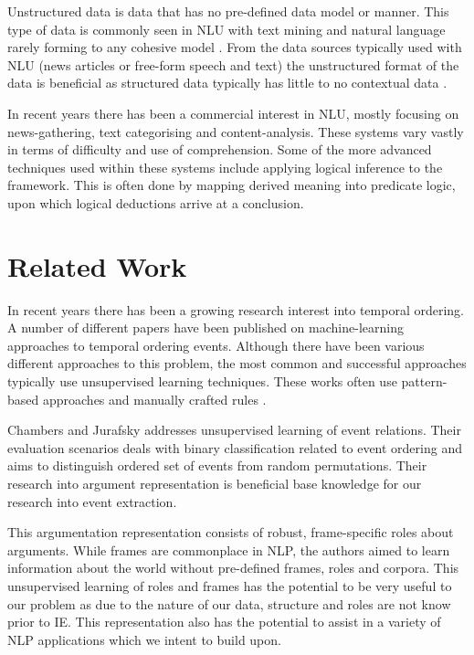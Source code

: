 \documentclass[bsc,frontabs,twoside,singlespacing,parskip,deptreport]{infthesis}     %
\begin{document}
Unstructured data is data that has no pre-defined data model or manner. This type of data is
commonly seen in NLU with text mining and natural language rarely forming to any cohesive model \cite{feldman2007text}.
From the data sources typically used with NLU (news articles or free-form speech and text) the unstructured format of
the data is beneficial as structured data typically has little to no contextual data \cite{feldman2007text}.

In recent years there has been a commercial interest in NLU, mostly focusing on news-gathering, text categorising and
content-analysis. These systems vary vastly in terms of difficulty and use of comprehension. Some of the more
advanced techniques used within these systems include applying logical inference to the framework. This is often done
by mapping derived meaning into predicate logic, upon which logical deductions arrive at a conclusion.


\section{Related Work}
In recent years there has been a growing research interest into temporal ordering.
A number of different papers have been published on machine-learning approaches to temporal ordering events.
Although there have been various different approaches to this problem, the most common and successful approaches typically
use unsupervised learning techniques. These works often use pattern-based approaches and manually crafted rules \cite{chklovski2004mining}.  

Chambers and Jurafsky\cite{chambers2009unsupervised} addresses unsupervised learning of event relations. Their evaluation
scenarios deals with binary classification related to event ordering and aims to distinguish ordered set
of events from random permutations. Their research into argument representation is beneficial base
knowledge for our research into event extraction.

This argumentation representation consists of robust,
frame-specific roles about arguments. While frames are commonplace in NLP, the authors aimed to learn information
about the world without pre-defined frames, roles and corpora. This unsupervised learning of roles and frames has the
potential to be very useful to our problem as due to the nature of our data, structure and roles are not know prior to
IE. This representation also has the potential to assist in a variety of NLP applications \cite{chambers2009unsupervised} which
we intent to build upon.
\end{document}
